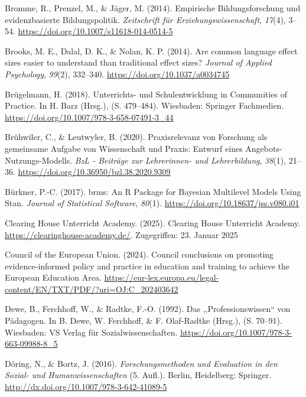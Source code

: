 \documentclass[
  jou,
  floatsintext,
  longtable,
  nolmodern,
  notxfonts,
  notimes,
  colorlinks=true,linkcolor=blue,citecolor=blue,urlcolor=blue]{apa7}
\newlength{\cslhangindent}
\newenvironment{CSLReferences}[2] %
 {\begin{list}{}{%
  \setlength{\itemindent}{0pt}
  \setlength{\leftmargin}{0pt}
  \setlength{\parsep}{0pt}
  \ifodd #1
   \setlength{\leftmargin}{\cslhangindent}
   \setlength{\itemindent}{-1\cslhangindent}
  \fi
  \setlength{\itemsep}{#2\baselineskip}}}
 {\end{list}}
\begin{document}
\begin{CSLReferences}{1}{0}
Bromme, R., Prenzel, M., \& Jäger, M. (2014). Empirische
Bildungsforschung und evidenzbasierte Bildungspolitik. \emph{Zeitschrift
für Erziehungswissenschaft}, \emph{17}(4), 3--54.
\url{https://doi.org/10.1007/s11618-014-0514-5}

Brooks, M. E., Dalal, D. K., \& Nolan, K. P. (2014). Are common language
effect sizes easier to understand than traditional effect sizes?
\emph{Journal of Applied Psychology}, \emph{99}(2), 332--340.
\url{https://doi.org/10.1037/a0034745}

Brügelmann, H. (2018). Unterrichts- und Schulentwicklung in Communities
of Practice. In H. Barz (Hrsg.), (S. 479--484). Wiesbaden: Springer
Fachmedien. \url{https://doi.org/10.1007/978-3-658-07491-3_44}

Brühwiler, C., \& Leutwyler, B. (2020). Praxisrelevanz von Forschung als
gemeinsame Aufgabe von Wissenschaft und Praxis: Entwurf eines
Angebots-Nutzungs-Modells. \emph{BzL - Beiträge zur Lehrerinnen- und
Lehrerbildung}, \emph{38}(1), 21--36.
\url{https://doi.org/10.36950/bzl.38.2020.9309}

Bürkner, P.-C. (2017). brms: An R Package for Bayesian Multilevel Models
Using Stan. \emph{Journal of Statistical Software}, \emph{80}(1).
\url{https://doi.org/10.18637/jss.v080.i01}

Clearing House Unterricht Academy. (2025). Clearing House Unterricht
Academy. \url{https://clearinghouse-academy.de/}. Zugegriffen: 23.
Januar 2025

Council of the European Union. (2024). Council conclusions on promoting
evidence-informed policy and practice in education and training to
achieve the European Education Area.
\url{https://eur-lex.europa.eu/legal-content/EN/TXT/PDF/?uri=OJ:C_202403642}

Dewe, B., Ferchhoff, W., \& Radtke, F.-O. (1992). Das
{,,}Professionswissen{``} von Pädagogen. In B. Dewe, W. Ferchhoff, \& F.
Olaf-Radtke (Hrsg.), (S. 70--91). Wiesbaden: VS Verlag für
Sozialwissenschaften. \url{https://doi.org/10.1007/978-3-663-09988-8_5}

Döring, N., \& Bortz, J. (2016). \emph{Forschungsmethoden und Evaluation
in den Sozial- und Humanwissenschaften} (5. Aufl.). Berlin, Heidelberg:
Springer. \url{http://dx.doi.org/10.1007/978-3-642-41089-5}


\end{CSLReferences}
\end{document}
